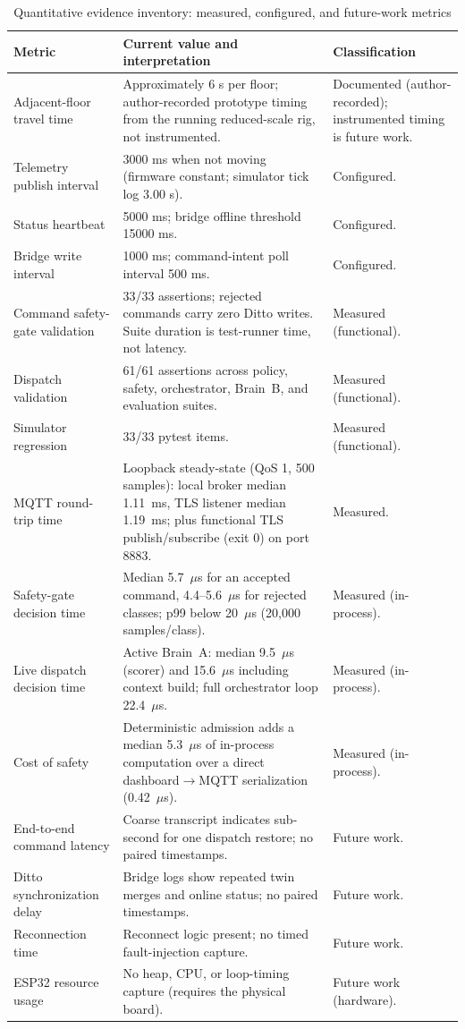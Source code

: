 \documentclass[journal]{IEEEtran}
\newcommand{\toprule}{\hline}
\newcommand{\midrule}{\hline}
\newcommand{\bottomrule}{\hline}
\begin{document}
\begin{table}[t]
\caption{Quantitative evidence inventory: measured, configured, and future-work metrics}
\label{tab:metrics}
\centering
\footnotesize
\begin{tabularx}{\textwidth}{@{}p{}Yp{0.20\textwidth}@{}}
\toprule
Metric & Current value and interpretation & Classification \\
\midrule
Adjacent-floor travel time & Approximately 6 s per floor; author-recorded prototype timing from the running reduced-scale rig, not instrumented. & Documented (author-recorded); instrumented timing is future work. \\
Telemetry publish interval & 3000 ms when not moving (firmware constant; simulator tick log 3.00 s). & Configured. \\
Status heartbeat & 5000 ms; bridge offline threshold 15000 ms. & Configured. \\
Bridge write interval & 1000 ms; command-intent poll interval 500 ms. & Configured. \\
Command safety-gate \mbox{validation} & 33/33 assertions; rejected commands carry zero Ditto writes. Suite duration is test-runner time, not latency. & Measured (functional). \\
Dispatch validation & 61/61 assertions across policy, safety, orchestrator, Brain~B, and evaluation suites. & Measured (functional). \\
Simulator regression & 33/33 pytest items. & Measured (functional). \\
MQTT round-trip time & Loopback steady-state (QoS 1, 500 samples): local broker median 1.11~ms, TLS listener median 1.19~ms; plus functional TLS publish/subscribe (exit 0) on port 8883. & Measured. \\
Safety-gate decision time & Median 5.7~$\mu$s for an accepted command, 4.4--5.6~$\mu$s for rejected classes; p99 below 20~$\mu$s (20{,}000 samples/class). & Measured (in-process). \\
Live dispatch decision time & Active Brain~A: median 9.5~$\mu$s (scorer) and 15.6~$\mu$s including context build; full orchestrator loop 22.4~$\mu$s. & Measured (in-process). \\
Cost of safety & Deterministic admission adds a median 5.3~$\mu$s of in-process computation over a direct dashboard$\rightarrow$MQTT serialization (0.42~$\mu$s). & Measured (in-process). \\
End-to-end command latency & Coarse transcript indicates sub-second for one dispatch restore; no paired timestamps. & Future work. \\
Ditto synchronization delay & Bridge logs show repeated twin merges and online status; no paired timestamps. & Future work. \\
Reconnection time & Reconnect logic present; no timed fault-injection capture. & Future work. \\
ESP32 resource usage & No heap, CPU, or loop-timing capture (requires the physical board). & Future work (hardware). \\
\bottomrule
\end{tabularx}
\end{table}
\end{document}
